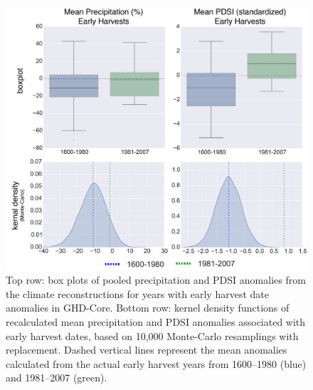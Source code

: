 \documentclass[12pt]{article}
\begin{document}
\begin{figure}
\center
\includegraphics[width=1.0\columnwidth,scale=2]{SUPP_fig_15_JJA_boxplot_monte.png}
\caption{Top row: box plots of pooled precipitation and PDSI anomalies from the climate reconstructions for years with early harvest date anomalies in GHD-Core. Bottom row: kernel density functions of recalculated mean precipitation and PDSI anomalies associated with early harvest dates, based on 10,000 Monte-Carlo resamplings with replacement. Dashed vertical lines represent the mean anomalies calculated from the actual early harvest years from 1600--1980 (blue) and 1981--2007 (green).}
\end{figure}

\end{document}
